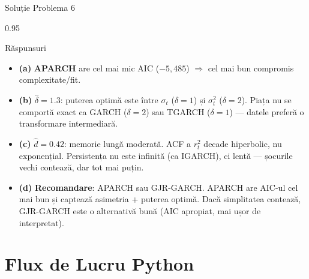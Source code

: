\documentclass[9pt, aspectratio=169, t]{beamer}
\begin{document}
\begin{frame}{Soluție Problema 6}
    \begin{cminipage}{0.95\textwidth}
    \begin{exampleblock}{Răspunsuri}
        \begin{itemize}\setlength{\itemsep}{0pt}
            \item \textbf{(a)} \textbf{APARCH} are cel mai mic AIC ($-5{,}485$) $\Rightarrow$ cel mai bun compromis complexitate/fit.

            \vspace{0.15cm}

            \item \textbf{(b)} $\hat{\delta} = 1.3$: puterea optimă este între $\sigma_t$ ($\delta=1$) și $\sigma_t^2$ ($\delta=2$). Piața nu se comportă exact ca GARCH ($\delta=2$) sau TGARCH ($\delta=1$) --- datele preferă o transformare intermediară.

            \vspace{0.15cm}

            \item \textbf{(c)} $\hat{d} = 0.42$: memorie lungă moderată. ACF a $r_t^2$ decade hiperbolic, nu exponențial. Persistența nu este infinită (ca IGARCH), ci lentă --- șocurile vechi contează, dar tot mai puțin.

            \vspace{0.15cm}

            \item \textbf{(d)} \textbf{Recomandare}: APARCH sau GJR-GARCH. APARCH are AIC-ul cel mai bun și captează asimetria + puterea optimă. Dacă simplitatea contează, GJR-GARCH este o alternativă bună (AIC apropiat, mai ușor de interpretat).
        \end{itemize}
    \end{exampleblock}
    \end{cminipage}
\end{frame}

\section{Flux de Lucru Python}
\end{document}
